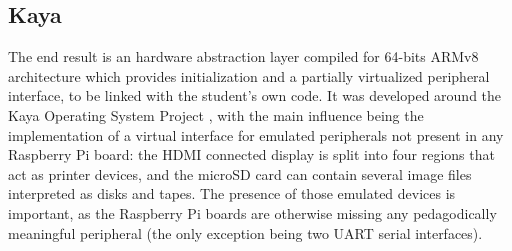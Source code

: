 \documentclass[12pt,a4paper,openright,twoside]{report}
\begin{document}
\subsection{Kaya}
The end result is an hardware abstraction layer compiled for 64-bits ARMv8
architecture  which provides initialization
and a partially virtualized peripheral interface, to be linked with the student's 
own code.
It was developed around the Kaya Operating System Project \cite{davolimorsiani},
 with the main influence
being the implementation of a virtual interface for emulated peripherals
 not present in any Raspberry Pi board: the HDMI connected display is split 
into four regions that act as printer devices, and the microSD card can contain
several image files interpreted as disks and tapes.
The presence of those emulated devices is important, as the Raspberry Pi boards
are otherwise missing any pedagodically meaningful peripheral (the only
exception being two UART serial interfaces).
\end{document}
